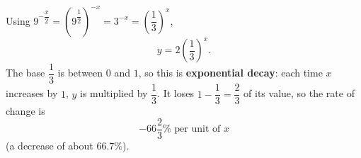 Using $9^{-\dfrac {x}{2}}=\left(9^{\dfrac{1}{2}}\right)^{-x}=3^{-x}=\left(\dfrac{1}{3}\right)^x$,
\[
y=\boxed{2\left(\dfrac{1}{3}\right)^x}.
\]
The base $\dfrac{1}{3}$ is between $0$ and $1$, so this is \textbf{exponential decay}: each time $x$ increases by $1$, $y$ is multiplied by $\dfrac{1}{3}$. It loses $1-\dfrac{1}{3}=\dfrac{2}{3}$ of its value, so the rate of change is
\[
\boxed{-66\dfrac{2}{3}\%\text{ per unit of }x}
\]
(a decrease of about $66.7\%$).
